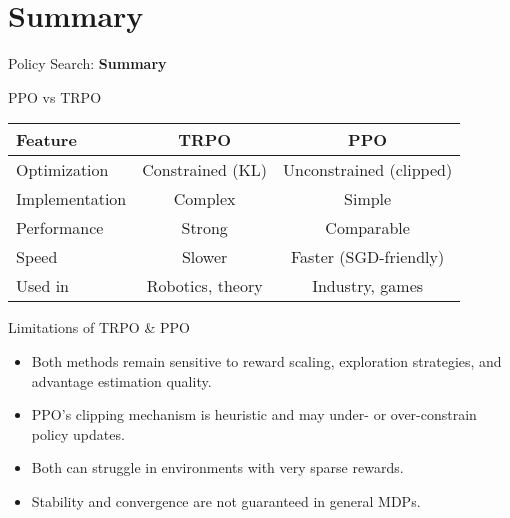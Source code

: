 \section{Summary}
\begin{frame}{}
    \LARGE Policy Search: \textbf{Summary}
\end{frame}

\begin{frame}{PPO vs TRPO}
    \begin{table}[]
        \centering
        \renewcommand{\arraystretch}{2.5}
        \begin{tabular}{lcc}
            \hline
            \textbf{Feature} & \textbf{TRPO} & \textbf{PPO} \\
            \hline
            Optimization & Constrained (KL) & Unconstrained (clipped) \\
            Implementation & Complex & Simple \\
            Performance & Strong & Comparable \\
            Speed & Slower & Faster (SGD-friendly) \\
            Used in & Robotics, theory & Industry, games \\
            \hline
        \end{tabular}
    \end{table}
\end{frame}

\begin{frame}{Limitations of TRPO \& PPO}
\begin{itemize}
    \item Both methods remain sensitive to reward scaling, exploration strategies, and advantage estimation quality.
    \item PPO's clipping mechanism is heuristic and may under- or over-constrain policy updates.
    \item Both can struggle in environments with very sparse rewards.
    \item Stability and convergence are not guaranteed in general MDPs.
\end{itemize}
\end{frame}

